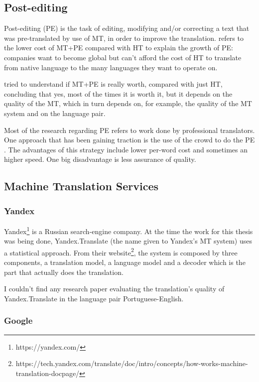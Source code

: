 \subsection{Post-editing}

Post-editing (PE) is the task of editing, modifying and/or correcting a text that was pre-translated by use of MT, in order to improve the translation. \citep{Somers2003} refers to the lower cost of MT+PE compared with HT to explain the growth of PE: companies want to become global but can't afford the cost of HT to translate from native language to the many languages they want to operate on.

\citep{Koponen2016a} tried to understand if MT+PE is really worth, compared with just HT, concluding that yes, most of the times it is worth it, but it depends on the quality of the MT, which in turn depends on, for example, the quality of the MT system and on the language pair. 

Most of the research regarding PE refers to work done by professional translators. One approach that has been gaining traction is the use of the crowd to do the PE \citep{Tatsumi2012a}. The advantages of this strategy include lower per-word cost and sometimes an higher speed. One big disadvantage is less assurance of quality. 

\subsection{Machine Translation Services}

\subsubsection{Yandex}

Yandex\footnote{https://yandex.com/} is a Russian search-engine company. At the time the work for this thesis was being done, Yandex.Translate (the name given to Yandex's MT system) uses a statistical approach. From their website\footnote{https://tech.yandex.com/translate/doc/intro/concepts/how-works-machine-translation-docpage/}, the system is composed by three components, a translation model, a language model and a decoder which is the part that actually does the translation. 

I couldn't find any research paper evaluating the translation's quality of Yandex.Translate in the language pair Portuguese-English.

\subsubsection{Google}

